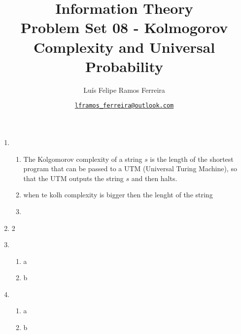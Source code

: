 \documentclass{article}
\title{Information Theory \\ \large Problem Set 08 - Kolmogorov Complexity and Universal Probability}
\author{Luís Felipe Ramos Ferreira}
\date{\href{mailto:lframos\_ferreira@outlook.com}{\texttt{lframos\_ferreira@outlook.com}}
}
\begin{document}
\maketitle

\begin{enumerate}
	\item \begin{enumerate}
			\item The Kolgomorov complexity of a string  \(s\) is the length of the shortest program that can be passed to a UTM (Universal Turing Machine),
			so that the UTM outputs the string \(s\) and then halts.
		\item when te kolh complexity is bigger then the lenght of the string
		\item 
	\end{enumerate}

\item 2 
\item \begin{enumerate}
		\item a 
		\item b
\end{enumerate}
\item \begin{enumerate}
		\item a
		\item b
\end{enumerate}
\end{enumerate}


\nocite{*}
\end{document}
